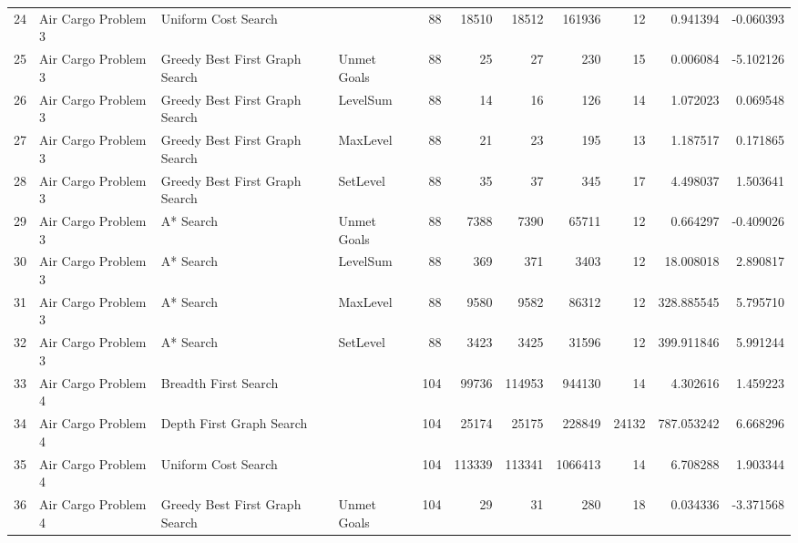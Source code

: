 \begin{tabular}{llllrrrrrrr}
24 &  Air Cargo Problem 3 &             Uniform Cost Search &              &       88 &       18510 &       18512 &     161936 &           12 &     0.941394 &   -0.060393 \\
25 &  Air Cargo Problem 3 &  Greedy Best First Graph Search &  Unmet Goals &       88 &          25 &          27 &        230 &           15 &     0.006084 &   -5.102126 \\
26 &  Air Cargo Problem 3 &  Greedy Best First Graph Search &     LevelSum &       88 &          14 &          16 &        126 &           14 &     1.072023 &    0.069548 \\
27 &  Air Cargo Problem 3 &  Greedy Best First Graph Search &     MaxLevel &       88 &          21 &          23 &        195 &           13 &     1.187517 &    0.171865 \\
28 &  Air Cargo Problem 3 &  Greedy Best First Graph Search &     SetLevel &       88 &          35 &          37 &        345 &           17 &     4.498037 &    1.503641 \\
29 &  Air Cargo Problem 3 &                       A* Search &  Unmet Goals &       88 &        7388 &        7390 &      65711 &           12 &     0.664297 &   -0.409026 \\
30 &  Air Cargo Problem 3 &                       A* Search &     LevelSum &       88 &         369 &         371 &       3403 &           12 &    18.008018 &    2.890817 \\
31 &  Air Cargo Problem 3 &                       A* Search &     MaxLevel &       88 &        9580 &        9582 &      86312 &           12 &   328.885545 &    5.795710 \\
32 &  Air Cargo Problem 3 &                       A* Search &     SetLevel &       88 &        3423 &        3425 &      31596 &           12 &   399.911846 &    5.991244 \\
33 &  Air Cargo Problem 4 &            Breadth First Search &              &      104 &       99736 &      114953 &     944130 &           14 &     4.302616 &    1.459223 \\
34 &  Air Cargo Problem 4 &        Depth First Graph Search &              &      104 &       25174 &       25175 &     228849 &        24132 &   787.053242 &    6.668296 \\
35 &  Air Cargo Problem 4 &             Uniform Cost Search &              &      104 &      113339 &      113341 &    1066413 &           14 &     6.708288 &    1.903344 \\
36 &  Air Cargo Problem 4 &  Greedy Best First Graph Search &  Unmet Goals &      104 &          29 &          31 &        280 &           18 &     0.034336 &   -3.371568 \\

\end{tabular}
